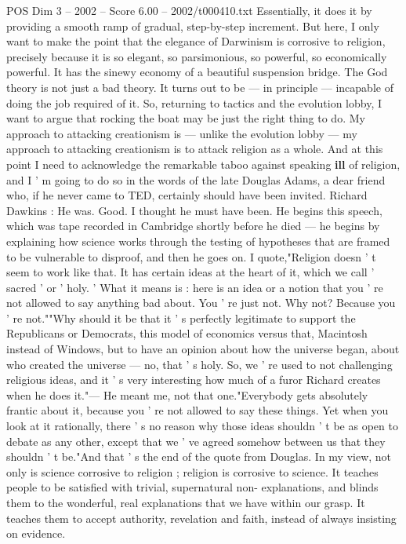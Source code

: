 \begin{textsample}{POS Dim 3 – 2002 – Score 6.00 – 2002/t000410.txt}
Essentially, it does it by providing a smooth ramp of gradual, step-by-step increment.
But here, I only want to make the point that the elegance of Darwinism is corrosive to religion, precisely because it is so elegant, so parsimonious, so powerful, so economically powerful.
It has the sinewy economy of a beautiful suspension bridge.
The God theory is not just a bad theory.
It turns out to be — in principle — incapable of doing the job required of it.
So, returning to tactics and the evolution lobby, I want to argue that rocking the boat may be just the right thing to do.
My approach to attacking creationism is — unlike the evolution lobby — my approach to attacking creationism is to attack religion as a whole.
And at this point I need to acknowledge the remarkable taboo against speaking \textbf{ill} of religion, and I ' m going to do so in the words of the late Douglas Adams, a dear friend who, if he never came to TED, certainly should have been invited.
Richard Dawkins : He was.
Good.
I thought he must have been.
He begins this speech, which was tape recorded in Cambridge shortly before he died — he begins by explaining how science works through the testing of hypotheses that are framed to be vulnerable to disproof, and then he goes on.
I quote,"Religion doesn ' t seem to work like that.
It has certain ideas at the heart of it, which we call ' sacred ' or ' holy. ' What it means is : here is an idea or a notion that you ' re not allowed to say anything bad about.
You ' re just not.
Why not?
Because you ' re not.""Why should it be that it ' s perfectly legitimate to support the Republicans or Democrats, this model of economics versus that, Macintosh instead of Windows, but to have an opinion about how the universe began, about who created the universe — no, that ' s holy.
So, we ' re used to not challenging religious ideas, and it ' s very interesting how much of a furor Richard creates when he does it."— He meant me, not that one."Everybody gets absolutely frantic about it, because you ' re not allowed to say these things.
Yet when you look at it rationally, there ' s no reason why those ideas shouldn ' t be as open to debate as any other, except that we ' ve agreed somehow between us that they shouldn ' t be."And that ' s the end of the quote from Douglas.
In my view, not only is science corrosive to religion ; religion is corrosive to science.
It teaches people to be satisfied with trivial, supernatural non- explanations, and blinds them to the wonderful, real explanations that we have within our grasp.
It teaches them to accept authority, revelation and faith, instead of always insisting on evidence.

\end{textsample}
